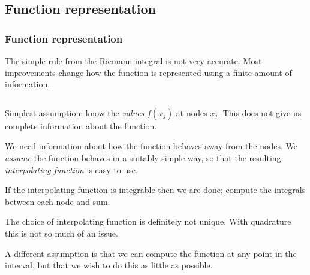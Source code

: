 \documentclass{beamer}
\begin{document}
\subsection{Function representation}

\begin{frame}
  \frametitle{Function representation}

  The simple rule from the Riemann integral is not very accurate. Most
  improvements change how the function is represented using a finite
  amount of information. \pause

  \vspace{1ex}

  \begin{columns}
    \begin{column}{0.5\textwidth}
      \begin{overlayarea}{\textwidth}{0.6\textheight}
        {
          Simplest assumption: know the \emph{values} $f(x_j)$ at
          nodes $x_j$. This does not give us complete information
          about the function.

          \vspace{1ex}
        }
        {

          We need information about how the function behaves away from
          the nodes. We \emph{assume} the function behaves in a
          suitably simple way, so that the resulting
          \emph{interpolating function} is easy to use.
        }
        {

          If the interpolating function is integrable then we are
          done; compute the integrals between each node and sum.
        }
        {

          The choice of interpolating function is definitely not
          unique. With quadrature this is not so much of an issue.
        }
        {
          A different assumption is that we can compute the function
          at any point in the interval, but that we wish to do this as
          little as possible.

}
\end{overlayarea}
\end{column}
\end{columns}
\end{frame}
\end{document}
